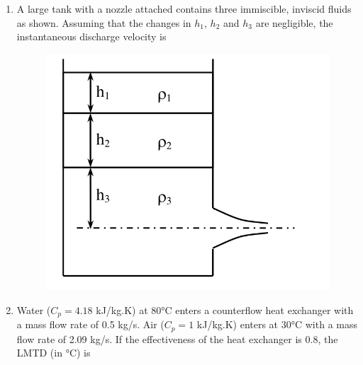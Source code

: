 \documentclass[journal,11pt,onecolumn]{IEEEtran}
\begin{document}
\begin{enumerate}[resume]
    \item A large tank with a nozzle attached contains three immiscible, inviscid fluids as shown. Assuming that the changes in \(h_1\), \(h_2\) and \(h_3\) are negligible, the instantaneous discharge velocity is
          \begin{figure}[H]
              \centering
              \includegraphics[scale=0.2]{q40}
              \caption{}
              \label{q40}
          \end{figure}

          \begin{enumerate}
          \end{enumerate}

    \item Water (\(C_p = 4.18\) kJ/kg.K) at 80°C enters a counterflow heat exchanger with a mass flow rate of 0.5 kg/s. Air (\(C_p = 1\) kJ/kg.K) enters at 30°C with a mass flow rate of 2.09 kg/s. If the effectiveness of the heat exchanger is 0.8, the LMTD (in °C) is


\end{enumerate}
\end{document}
